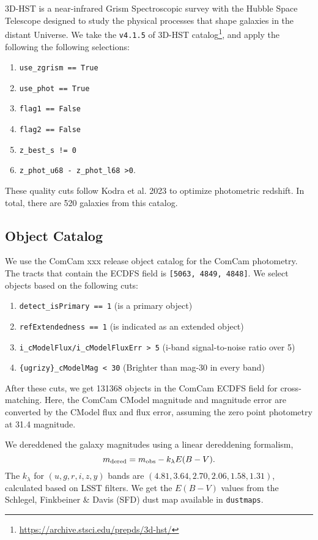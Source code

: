 3D-HST is a near-infrared Grism Spectroscopic survey with the Hubble Space Telescope designed to study the physical processes that shape galaxies in the distant Universe. We take the \texttt{v4.1.5} of 3D-HST catalog\footnote{\url{https://archive.stsci.edu/prepds/3d-hst/}}, and apply the following the following selections:
\begin{enumerate}
	\item \texttt{use\_zgrism == True}
	\item \texttt{use\_phot == True}
	\item \texttt{flag1 == False}
	\item \texttt{flag2 == False}
	\item \texttt{z\_best\_s != 0}
	\item \texttt{z\_phot\_u68 - z\_phot\_l68 >0}.
\end{enumerate}
These quality cuts follow Kodra et al. 2023 to optimize photometric redshift. In total, there are 520 galaxies from this catalog. 

\subsection{Object Catalog}

We use the ComCam xxx release object catalog for the ComCam photometry. The tracts that contain the ECDFS field is \texttt{[5063, 4849, 4848]}. We select objects based on the following cuts:
\begin{enumerate}
	\item \texttt{detect\_isPrimary == 1} (is a primary object)
	\item \texttt{refExtendedness == 1} (is indicated as an extended object)
	\item \texttt{i\_cModelFlux/i\_cModelFluxErr > 5} (i-band signal-to-noise ratio over 5)
	\item \texttt{\{ugrizy\}\_cModelMag < 30} (Brighter than mag-30 in every band)
\end{enumerate}
After these cuts, we get 131368 objects in the ComCam ECDFS field for cross-matching. Here, the ComCam CModel magnitude and magnitude error are converted by the CModel flux and flux error, assuming the zero point photometry at 31.4 magnitude. 

We dereddened the galaxy magnitudes using a linear dereddening formalism,
\begin{equation}
m_{\rm dered} = m_{\rm obs} - k_{\lambda} E(B-V). 
\end{equation}
The $k_{\lambda}$ for $(u,g,r,i,z,y)$ bands are $(4.81,3.64,2.70,2.06,1.58,1.31)$, calculated based on LSST filters. We get the $E(B-V)$ values from the Schlegel, Finkbeiner \& Davis (SFD) dust map available in \texttt{dustmaps}. 


